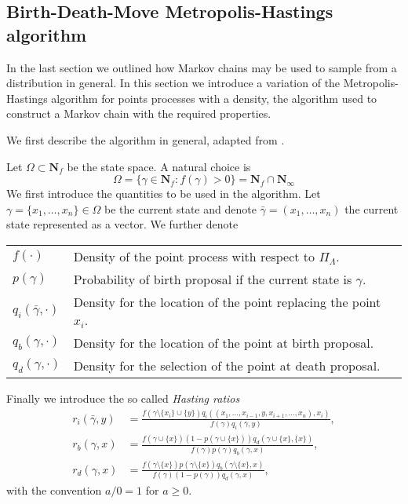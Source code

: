 \subsection{Birth-Death-Move Metropolis-Hastings algorithm}
In the last section we outlined how Markov chains may be used to sample from a distribution in general. In this section we introduce a variation of the Metropolis-Hastings algorithm for points processes with a density, the algorithm used to construct a Markov chain with the required properties. 

We first describe the algorithm in general, adapted from \cite{MollerWaagepetersen2003}. \newline

\noindent Let $\Omega\subset \mathbf N_f$ be the state space. A natural choice is 
$$\Omega=\{\gamma \in \mathbf N_f: f(\gamma)>0 \} = \mathbf N_f \cap \mathbf N_\infty$$
We first introduce the quantities to be used in the algorithm. Let $\gamma = \{x_1,\dots, x_n\} \in \Omega$ be the current state and denote $\bar\gamma = (x_1,\dots, x_n)$ the current state represented as a vector. We further denote 

\begin{tabular}{ll}
$f(\cdot)$ & Density of the point process with respect to  $\Pi_\Lambda$. \\
$p(\gamma)$ & Probability of birth proposal if the current state is $\gamma$.  \\
$q_i(\bar\gamma,\cdot)$ & Density for the location of the point replacing the point $x_i$. \\
$q_b(\gamma,\cdot)$ & Density for the location of the point at birth proposal. \\
$q_d(\gamma,\cdot)$ & Density for the selection of the point at death proposal. 
\end{tabular}

\noindent Finally we introduce the so called \textit{Hasting ratios}
\begin{align*}
r_i(\bar \gamma,y) &= \frac{f(\gamma \setminus \{x_i\} \cup \{y\}) q_i((x_1,\dots,x_{i-1},y,x_{i+1},\dots,x_n), x_i) }{f(\gamma)q_i(\bar\gamma,y)}, \\
r_b(\gamma,x) &= \frac{f(\gamma \cup \{x\})(1-p(\gamma \cup \{x\})) q_d(\gamma \cup \{x\}, \{x\})}{f(\gamma)p(\gamma)q_b(\gamma,x)}, \\
r_d(\gamma,x) &= \frac{f(\gamma \setminus \{x\})p(\gamma \setminus\{x\}) q_b(\gamma \setminus \{x\}, x)}{f(\gamma)(1-p(\gamma))q_d(\gamma,x)},
\end{align*}
with the convention $a/0=1$ for $a\geq 0$.\newline


